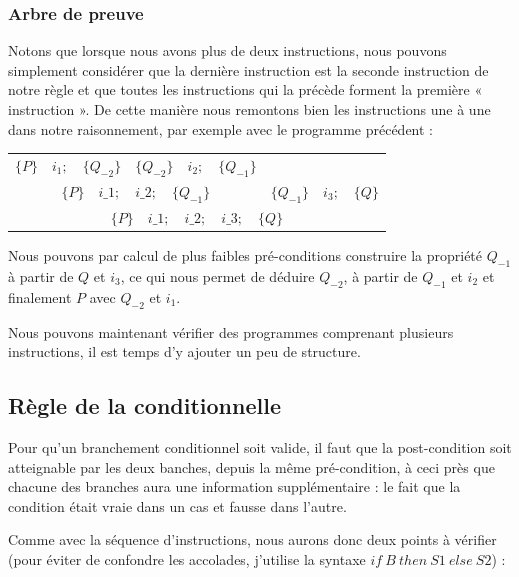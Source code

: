 \documentclass[12pt,francais,]{scrbook}
\begin{document}
\subsubsection{Arbre de preuve}\label{arbre-de-preuve}

Notons que lorsque nous avons plus de deux instructions, nous pouvons
simplement considérer que la dernière instruction est la seconde
instruction de notre règle et que toutes les instructions qui la précède
forment la première « instruction ». De cette manière nous remontons
bien les instructions une à une dans notre raisonnement, par exemple
avec le programme précédent :

\begin{center}
\begin{tabular}{ccc}
  $\{P\}\quad i_1 ; \quad \{Q_{-2}\}$ & $\{Q_{-2}\}\quad i_2 ; \quad \{Q_{-1}\}$ & \\
  \cline{1-2}
  \multicolumn{2}{c}{$\{P\}\quad i\_1 ; \quad i\_2 ; \quad \{Q_{-1}\}$} & $\{Q_{-1}\} \quad i_3 ; \quad \{Q\}$\\
  \hline
  \multicolumn{3}{c}{$\{P\}\quad i\_1 ; \quad i\_2 ; \quad i\_3; \quad \{ Q \}$}
\end{tabular}
\end{center}

Nous pouvons par calcul de plus faibles pré-conditions construire la
propriété \(Q_{-1}\) à partir de \(Q\) et \(i_3\), ce qui nous permet de
déduire \(Q_{-2}\), à partir de \(Q_{-1}\) et \(i_2\) et finalement
\(P\) avec \(Q_{-2}\) et \(i_1\).

Nous pouvons maintenant vérifier des programmes comprenant plusieurs
instructions, il est temps d'y ajouter un peu de structure.

\subsection{Règle de la
conditionnelle}\label{ruxe8gle-de-la-conditionnelle}

Pour qu'un branchement conditionnel soit valide, il faut que la
post-condition soit atteignable par les deux banches, depuis la même
pré-condition, à ceci près que chacune des branches aura une information
supplémentaire : le fait que la condition était vraie dans un cas et
fausse dans l'autre.

Comme avec la séquence d'instructions, nous aurons donc deux points à
vérifier (pour éviter de confondre les accolades, j'utilise la syntaxe
\(if\ B\ then\ S1\ else\ S2\)) :
\end{document}
